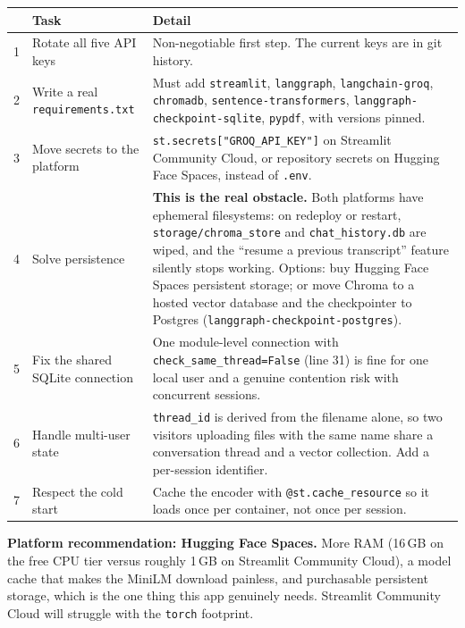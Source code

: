 \documentclass[11pt,a4paper]{article}
\begin{document}
\begin{longtable}{@{}p{0.6cm}p{6.2cm}p{8.6cm}@{}}
\toprule
& \textbf{Task} & \textbf{Detail} \\
\midrule
\endhead
1 & Rotate all five API keys & Non-negotiable first step. The current keys are in
git history. \\
2 & Write a real \texttt{requirements.txt} & Must add \texttt{streamlit},
\texttt{langgraph}, \texttt{langchain-groq}, \texttt{chromadb},
\texttt{sentence-transformers}, \texttt{langgraph-checkpoint-sqlite},
\texttt{pypdf}, with versions pinned. \\
3 & Move secrets to the platform & \texttt{st.secrets["GROQ\_API\_KEY"]} on
Streamlit Community Cloud, or repository secrets on Hugging Face Spaces, instead
of \texttt{.env}. \\
4 & Solve persistence & \textbf{This is the real obstacle.} Both platforms have
ephemeral filesystems: on redeploy or restart, \texttt{storage/chroma\_store} and
\texttt{chat\_history.db} are wiped, and the ``resume a previous transcript''
feature silently stops working. Options: buy Hugging Face Spaces persistent
storage; or move Chroma to a hosted vector database and the checkpointer to
Postgres (\texttt{langgraph-checkpoint-postgres}). \\
5 & Fix the shared SQLite connection & One module-level connection with
\texttt{check\_same\_thread=False} (line 31) is fine for one local user and a
genuine contention risk with concurrent sessions. \\
6 & Handle multi-user state & \texttt{thread\_id} is derived from the filename
alone, so two visitors uploading files with the same name share a conversation
thread and a vector collection. Add a per-session identifier. \\
7 & Respect the cold start & Cache the encoder with
\texttt{@st.cache\_resource} so it loads once per container, not once per
session. \\
\bottomrule
\end{longtable}

\noindent
\textbf{Platform recommendation: Hugging Face Spaces.} More RAM (16\,GB on the
free CPU tier versus roughly 1\,GB on Streamlit Community Cloud), a model cache
that makes the MiniLM download painless, and purchasable persistent storage,
which is the one thing this app genuinely needs. Streamlit Community Cloud will
struggle with the \texttt{torch} footprint.

\end{document}
